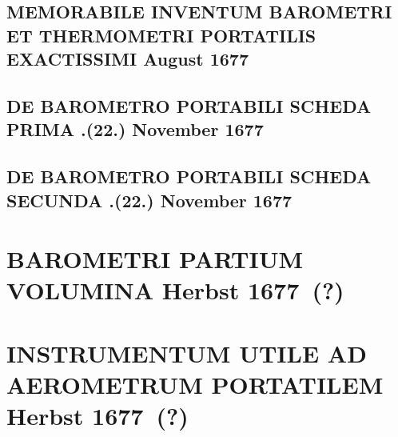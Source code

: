 \documentclass[%
fontsize=10pt,
]{scrbook}
\DeclareRobustCommand{\bracks}[1]{%
\textup{\lbrack}#1\textup{\rbrack}}
\begin{document}
\section[tocentry={Memorabile inventum barometri et thermometri portatilis exactissimi
\enskip August 1677},
head={Memorabile inventum barometri et thermometri %
}]%
{\MakeUppercase{Memorabile inventum barometri et thermometri portatilis exactissimi}
\newline August 1677}
\label{57037-1}



\section[tocentry={De barometro portabili scheda prima
\enskip 12.\;(22.) November 1677},
head={De barometro portabili scheda I}]%
{\MakeUppercase{De barometro portabili scheda prima}
.\;(22.) November 1677}
\label{57038}


\section[tocentry={De barometro portabili scheda secunda
\enskip 12.\;(22.) November 1677},
head={De barometro portabili scheda II}]%
{\MakeUppercase{De barometro portabili scheda secunda}
.\;(22.) November 1677}
\label{57039}



\chapter[tocentry={Barometri partium volumina
\enskip%
\bracks{%
Herbst 1677~(?)%
}%
}, %
head={Barometri partium volumina %
}]%
{\MakeUppercase{Barometri partium volumina}
\newline%
\bracks{%
Herbst 1677~(?)%
}%
}%
\label{57960}




\chapter[tocentry={Instrumentum utile ad aerometrum portatilem
\enskip%
\lbrack Herbst 1677~(?)\rbrack%
}, %
head={Instrumentum utile ad aerometrum portatilem %
}]%
{\MakeUppercase{Instrumentum utile ad aerometrum portatilem}
\newline%
\lbrack Herbst 1677~(?)\rbrack%
} %
\label{55813-E}

\end{document}
